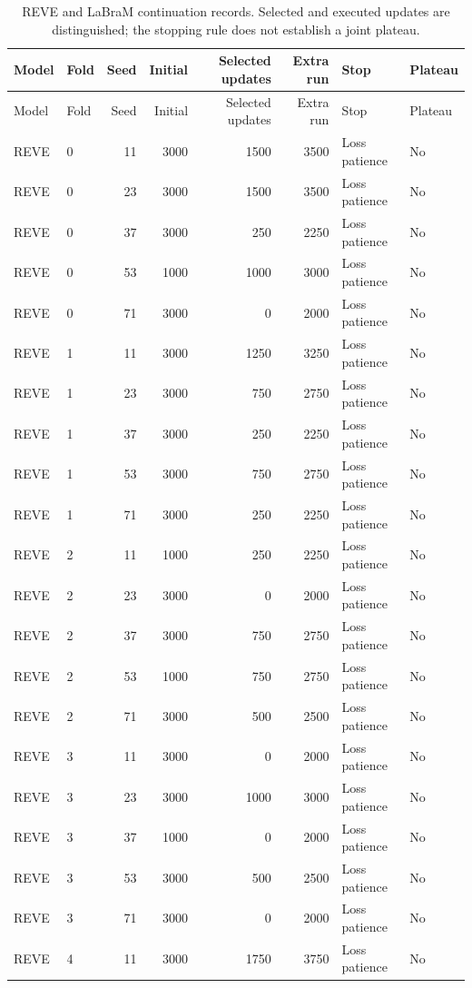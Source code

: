 \begin{longtable}{llrrrrp{1.05in}l}
\caption{REVE and LaBraM continuation records. Selected and executed updates are distinguished; the stopping rule does not establish a joint plateau.}\label{tab:cross_convergence}\\
\toprule
Model & Fold & Seed & Initial & Selected updates & Extra run & Stop & Plateau \\
\midrule
\endfirsthead
\toprule
Model & Fold & Seed & Initial & Selected updates & Extra run & Stop & Plateau \\
\midrule
\endhead
REVE & 0 & 11 & 3000 & 1500 & 3500 & Loss patience & No \\
REVE & 0 & 23 & 3000 & 1500 & 3500 & Loss patience & No \\
REVE & 0 & 37 & 3000 & 250 & 2250 & Loss patience & No \\
REVE & 0 & 53 & 1000 & 1000 & 3000 & Loss patience & No \\
REVE & 0 & 71 & 3000 & 0 & 2000 & Loss patience & No \\
REVE & 1 & 11 & 3000 & 1250 & 3250 & Loss patience & No \\
REVE & 1 & 23 & 3000 & 750 & 2750 & Loss patience & No \\
REVE & 1 & 37 & 3000 & 250 & 2250 & Loss patience & No \\
REVE & 1 & 53 & 3000 & 750 & 2750 & Loss patience & No \\
REVE & 1 & 71 & 3000 & 250 & 2250 & Loss patience & No \\
REVE & 2 & 11 & 1000 & 250 & 2250 & Loss patience & No \\
REVE & 2 & 23 & 3000 & 0 & 2000 & Loss patience & No \\
REVE & 2 & 37 & 3000 & 750 & 2750 & Loss patience & No \\
REVE & 2 & 53 & 1000 & 750 & 2750 & Loss patience & No \\
REVE & 2 & 71 & 3000 & 500 & 2500 & Loss patience & No \\
REVE & 3 & 11 & 3000 & 0 & 2000 & Loss patience & No \\
REVE & 3 & 23 & 3000 & 1000 & 3000 & Loss patience & No \\
REVE & 3 & 37 & 1000 & 0 & 2000 & Loss patience & No \\
REVE & 3 & 53 & 3000 & 500 & 2500 & Loss patience & No \\
REVE & 3 & 71 & 3000 & 0 & 2000 & Loss patience & No \\
REVE & 4 & 11 & 3000 & 1750 & 3750 & Loss patience & No \\

\end{longtable}
